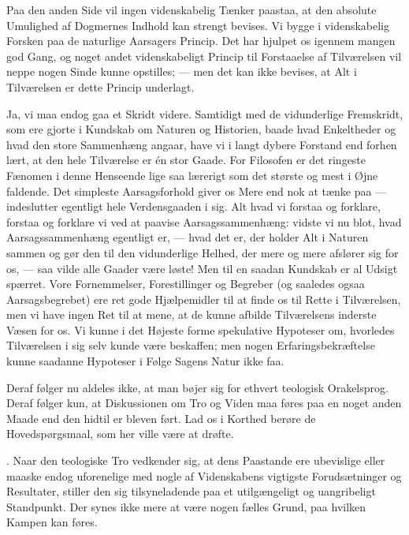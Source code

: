 \documentclass[12pt,a4paper]{article}
\newcommand{\apage}[1]{\marginnote{\footnotesize\textit{[#1]}}}
\begin{document}
Paa den anden Side vil ingen videnskabelig Tænker paastaa, at den absolute
Umulighed af Dogmernes Indhold kan strengt bevises. Vi bygge i videnskabelig
Forsken paa de naturlige Aarsagers Princip. Det har hjulpet os igennem mangen god
Gang, og noget andet videnskabeligt Princip til Forstaaelse af Tilværelsen vil
neppe nogen Sinde kunne opstilles; --- men det kan ikke bevises, at Alt i
Tilværelsen er dette Princip underlagt.

Ja, vi maa endog gaa et Skridt videre. Samtidigt med de vidunderlige Fremskridt,
som ere gjorte i Kundskab om Naturen og Historien, baade hvad Enkeltheder og hvad
den store Sammenhæng angaar, have vi i langt dybere Forstand end forhen lært, at
den hele Tilværelse er én stor Gaade. For Filosofen er det ringeste Fænomen i
denne Henseende lige saa lærerigt som det største og mest i Øjne faldende. Det
simpleste Aarsagsforhold giver os Mere end nok at tænke paa --- indeslutter
egentligt hele Verdensgaaden i sig. Alt hvad vi forstaa og forklare, forstaa og
forklare vi ved at paavise Aarsagssammenhæng: vidste vi nu blot, hvad
Aarsagssammenhæng egentligt er, --- hvad det er, der holder Alt i Naturen sammen
og gør den til den vidunderlige Helhed, der mere og mere afslører sig for os, ---
saa vilde alle Gaader være løste! Men til en saadan Kundskab er al Udsigt spærret.
Vore Fornemmelser, Forestillinger og Begreber (og saaledes ogsaa Aarsagsbegrebet)
ere ret gode Hjælpemidler til at finde os til Rette i Tilværelsen, men vi \apage{211} have
ingen Ret til at mene, at de kunne afbilde Tilværelsens inderste Væsen for os. Vi
kunne i det Højeste forme spekulative Hypoteser om, hvorledes Tilværelsen i sig
selv kunde være beskaffen; men nogen Erfaringsbekræftelse kunne saadanne Hypoteser
i Følge Sagens Natur ikke faa.

Deraf følger nu aldeles ikke, at man bøjer sig for ethvert teologisk Orakelsprog.
Deraf følger kun, at Diskussionen om Tro og Viden maa føres paa en noget anden
Maade end den hidtil er bleven ført. Lad os i Korthed berøre de Hovedspørgsmaal,
som her ville være at drøfte.

\medskip
{}. Naar den teologiske Tro vedkender sig, at dens Paastande ere
ubevislige eller maaske endog uforenelige med nogle af Videnskabens vigtigste
Forudsætninger og Resultater, stiller den sig tilsyneladende paa et utilgængeligt
og uangribeligt Standpunkt. Der synes ikke mere at være nogen fælles Grund, paa
hvilken Kampen kan føres.
\end{document}
